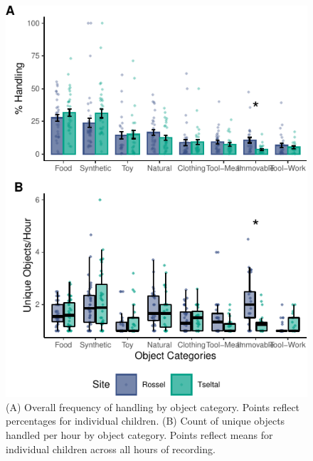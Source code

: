\documentclass[10pt, letterpaper]{article}
\newenvironment{CodeChunk}{}{}
\begin{document}
\begin{CodeChunk}
\begin{figure}[!h]

{\centering \includegraphics{figs/overall-stats-fig-1} 

}

\caption[(A) Overall frequency of handling by object category]{(A) Overall frequency of handling by object category. Points reflect percentages for individual children. (B) Count of unique objects handled per hour by object category. Points reflect means for individual children across all hours of recording.}\label{fig:overall-stats-fig}
\end{figure}
\end{CodeChunk}
\end{document}
